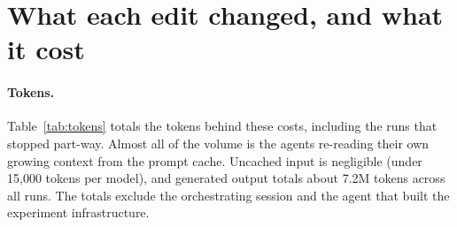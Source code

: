 \section{What each edit changed, and what it cost}
\label{app:cost}
\begin{table}[h]
\centering\scriptsize
\resizebox{\linewidth}{!}{}
\caption{Every Qwen edit: weights changed out of 1,543,714,304, budgeted forward passes used (at most 50 passes of 512 examples), and the programmer's API cost at list prices, computed from its transcript (input, output and cache tokens). SmolLM2 runs: SST-5 inverted 22,528 weights, 39 passes, \$18; facts 5.57M weights, 4 passes, \$21.}
\label{tab:cost}
\end{table}

\paragraph{Tokens.} Table~\ref{tab:tokens} totals the tokens behind these costs, including the runs that stopped part-way. Almost all of the volume is the agents re-reading their own growing context from the prompt cache. Uncached input is negligible (under 15,000 tokens per model), and generated output totals about 7.2M tokens across all runs. The totals exclude the orchestrating session and the agent that built the experiment infrastructure.
\begin{table}[h]
\centering\small

\caption{API tokens (millions) and cost at list prices by role and model, over all programmer runs (including the four stopped runs and the excluded Twin-2K \texttt{r4}) and all audits.}
\label{tab:tokens}
\end{table}
